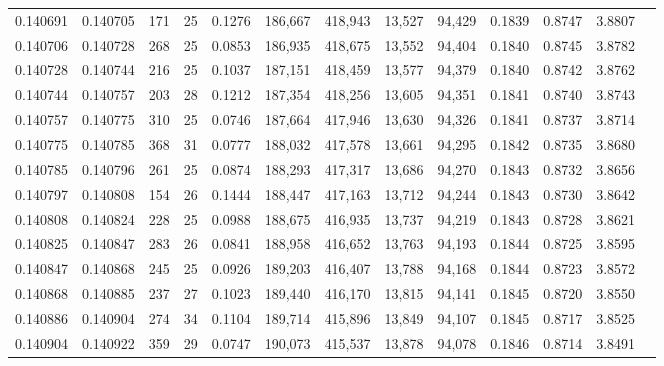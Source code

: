 \begin{tabular}{rrrrrrrrrrrrr}
0.140691 & 0.140705 & 171 &  25 &                                     0.1276 & 186,667 & 418,943 &  13,527 &  94,429 & 0.1839 & 0.8747 & 3.8807 \\
0.140706 & 0.140728 & 268 &  25 &                                     0.0853 & 186,935 & 418,675 &  13,552 &  94,404 & 0.1840 & 0.8745 & 3.8782 \\
0.140728 & 0.140744 & 216 &  25 &                                     0.1037 & 187,151 & 418,459 &  13,577 &  94,379 & 0.1840 & 0.8742 & 3.8762 \\
0.140744 & 0.140757 & 203 &  28 &                                     0.1212 & 187,354 & 418,256 &  13,605 &  94,351 & 0.1841 & 0.8740 & 3.8743 \\
0.140757 & 0.140775 & 310 &  25 &                                     0.0746 & 187,664 & 417,946 &  13,630 &  94,326 & 0.1841 & 0.8737 & 3.8714 \\
0.140775 & 0.140785 & 368 &  31 &                                     0.0777 & 188,032 & 417,578 &  13,661 &  94,295 & 0.1842 & 0.8735 & 3.8680 \\
0.140785 & 0.140796 & 261 &  25 &                                     0.0874 & 188,293 & 417,317 &  13,686 &  94,270 & 0.1843 & 0.8732 & 3.8656 \\
0.140797 & 0.140808 & 154 &  26 &                                     0.1444 & 188,447 & 417,163 &  13,712 &  94,244 & 0.1843 & 0.8730 & 3.8642 \\
0.140808 & 0.140824 & 228 &  25 &                                     0.0988 & 188,675 & 416,935 &  13,737 &  94,219 & 0.1843 & 0.8728 & 3.8621 \\
0.140825 & 0.140847 & 283 &  26 &                                     0.0841 & 188,958 & 416,652 &  13,763 &  94,193 & 0.1844 & 0.8725 & 3.8595 \\
0.140847 & 0.140868 & 245 &  25 &                                     0.0926 & 189,203 & 416,407 &  13,788 &  94,168 & 0.1844 & 0.8723 & 3.8572 \\
0.140868 & 0.140885 & 237 &  27 &                                     0.1023 & 189,440 & 416,170 &  13,815 &  94,141 & 0.1845 & 0.8720 & 3.8550 \\
0.140886 & 0.140904 & 274 &  34 &                                     0.1104 & 189,714 & 415,896 &  13,849 &  94,107 & 0.1845 & 0.8717 & 3.8525 \\
0.140904 & 0.140922 & 359 &  29 &                                     0.0747 & 190,073 & 415,537 &  13,878 &  94,078 & 0.1846 & 0.8714 & 3.8491 \\

\end{tabular}
